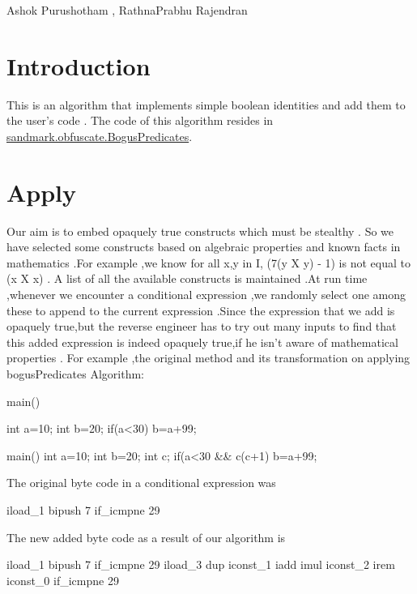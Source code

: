 %
          {Ashok Purushotham , RathnaPrabhu Rajendran}

\section{Introduction}
This is an algorithm that implements simple boolean identities  and add them to the user's code . The code of this algorithm resides in \url{sandmark.obfuscate.BogusPredicates}.


\section{Apply}
Our aim is to embed opaquely true constructs which must be stealthy . So we have selected some constructs based on algebraic properties and known facts in mathematics .For example ,we know for all x,y in I, (7(y X y) - 1) is not equal to (x X x) . A list of all the available constructs is maintained .At run time ,whenever we encounter a conditional expression ,we
randomly select one among these to append to the current expression .Since the expression that we add is opaquely true,but the reverse engineer has to try out many inputs to find that this added expression is indeed opaquely true,if he isn't aware of mathematical properties .
For example ,the original method and its transformation on applying bogusPredicates Algorithm:
\begin{listing}{3}
main(){
 int a=10;
 int b=20;
 if(a<30)
   b=a+99;

}

main(){
 int a=10;
 int b=20;
 int c;
 if(a<30 && c(c+1)%
   b=a+99; 
}

\end{listing}

The original byte code in a conditional expression was
\begin{listing}{1}
  iload_1
  bipush 7
  if_icmpne 29
\end{listing} 
The new added byte code as a result of our algorithm is 
\begin{listing}{2}
  iload_1
  bipush 7
  if_icmpne 29
  iload_3
  dup
  iconst_1
  iadd
  imul
  iconst_2
  irem
  iconst_0
  if_icmpne 29
\end{listing} 















